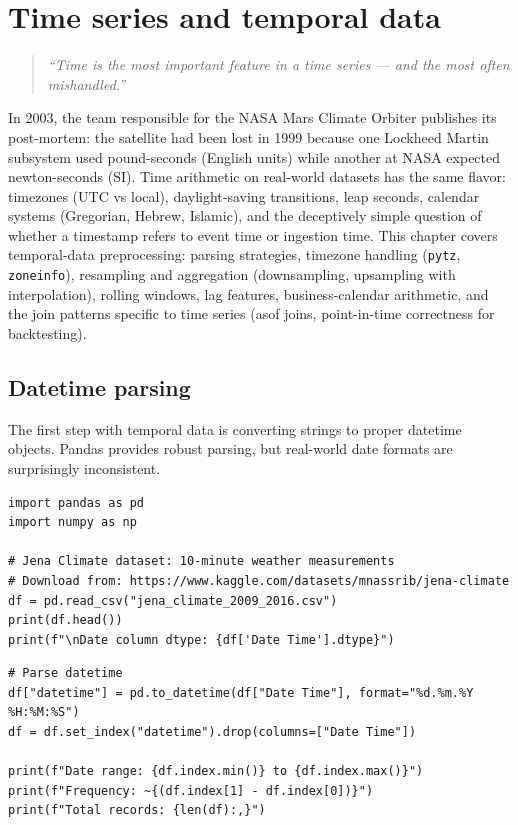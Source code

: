 \chapter{Time series and temporal data}
\label{ch:temporal-data}

\begin{quote}
\emph{``Time is the most important feature in a time series --- and the most often mishandled.''}
\end{quote}

In 2003, the team responsible for the NASA Mars Climate Orbiter publishes its post-mortem: the satellite had been lost in 1999 because one Lockheed Martin subsystem used pound-seconds (English units) while another at NASA expected newton-seconds (SI). Time arithmetic on real-world datasets has the same flavor: timezones (UTC vs local), daylight-saving transitions, leap seconds, calendar systems (Gregorian, Hebrew, Islamic), and the deceptively simple question of whether a timestamp refers to event time or ingestion time. This chapter covers temporal-data preprocessing: parsing strategies, timezone handling (\texttt{pytz}, \texttt{zoneinfo}), resampling and aggregation (downsampling, upsampling with interpolation), rolling windows, lag features, business-calendar arithmetic, and the join patterns specific to time series (asof joins, point-in-time correctness for backtesting).

\section{Datetime parsing}

The first step with temporal data is converting strings to proper datetime objects. Pandas provides robust parsing, but real-world date formats are surprisingly inconsistent.

\begin{verbatim}
import pandas as pd
import numpy as np

# Jena Climate dataset: 10-minute weather measurements
# Download from: https://www.kaggle.com/datasets/mnassrib/jena-climate
df = pd.read_csv("jena_climate_2009_2016.csv")
print(df.head())
print(f"\nDate column dtype: {df['Date Time'].dtype}")
\end{verbatim}

\begin{verbatim}
# Parse datetime
df["datetime"] = pd.to_datetime(df["Date Time"], format="%d.%m.%Y %H:%M:%S")
df = df.set_index("datetime").drop(columns=["Date Time"])

print(f"Date range: {df.index.min()} to {df.index.max()}")
print(f"Frequency: ~{(df.index[1] - df.index[0])}")
print(f"Total records: {len(df):,}")
\end{verbatim}

